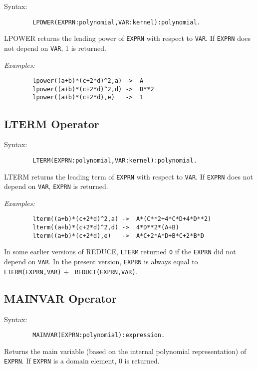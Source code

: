 \begin{samepage}
Syntax:
\begin{verbatim}
        LPOWER(EXPRN:polynomial,VAR:kernel):polynomial.
\end{verbatim}
LPOWER returns the leading power of {\tt EXPRN} with respect to {\tt VAR}.
If {\tt EXPRN} does not depend on {\tt VAR}, 1 is returned.
\end{samepage}

{\it Examples:}
\begin{verbatim}
        lpower((a+b)*(c+2*d)^2,a) ->  A
        lpower((a+b)*(c+2*d)^2,d) ->  D**2
        lpower((a+b)*(c+2*d),e)   ->  1
\end{verbatim}

\subsection{LTERM Operator}

\begin{samepage}
Syntax:
\begin{verbatim}
        LTERM(EXPRN:polynomial,VAR:kernel):polynomial.
\end{verbatim}
LTERM returns the leading term of {\tt EXPRN} with respect to {\tt VAR}.
If {\tt EXPRN} does not depend on {\tt VAR}, {\tt EXPRN} is returned.
\end{samepage}

{\it Examples:}
\begin{verbatim}
        lterm((a+b)*(c+2*d)^2,a) ->  A*(C**2+4*C*D+4*D**2)
        lterm((a+b)*(c+2*d)^2,d) ->  4*D**2*(A+B)
        lterm((a+b)*(c+2*d),e)   ->  A*C+2*A*D+B*C+2*B*D
\end{verbatim}

{\COMPATNOTE} In some earlier versions of REDUCE, {\tt LTERM} returned
{\tt 0} if the {\tt EXPRN} did not depend on {\tt VAR}.  In the present
version, {\tt EXPRN} is always equal to {\tt LTERM(EXPRN,VAR)} $+$ {\tt
REDUCT(EXPRN,VAR)}.

\subsection{MAINVAR Operator}

Syntax:
\begin{verbatim}
        MAINVAR(EXPRN:polynomial):expression.
\end{verbatim}
Returns the main variable (based on the internal polynomial representation)
of {\tt EXPRN}. If {\tt EXPRN} is a domain element, 0 is returned.

